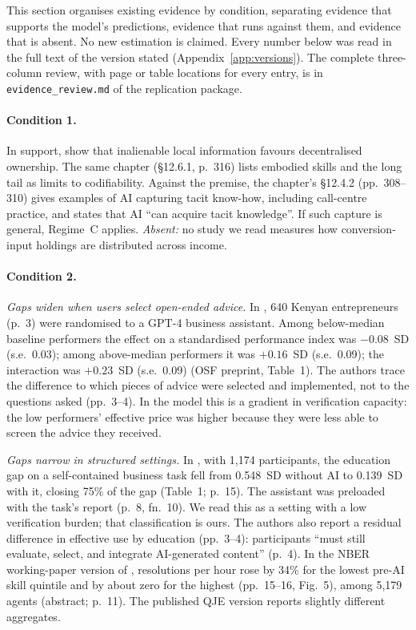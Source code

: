 \documentclass[12pt]{article}
\theoremstyle{remark}
\begin{document}
This section organises existing evidence by condition, separating evidence that supports the model's predictions, evidence that runs against them, and evidence that is absent. No new estimation is claimed. Every number below was read in the full text of the version stated (Appendix~\ref{app:versions}). The complete three-column review, with page or table locations for every entry, is in \texttt{evidence\_review.md} of the replication package.

\paragraph{Condition 1.} In support, \citet[Proposition~2, p.~308]{brynjolfsson2026hayek} show that inalienable local information favours decentralised ownership. The same chapter (\S12.6.1, p.~316) lists embodied skills and the long tail as limits to codifiability. Against the premise, the chapter's \S12.4.2 (pp.~308--310) gives examples of AI capturing tacit know-how, including call-centre practice, and \citet[p.~33]{garicano2026comment} states that AI ``can acquire tacit knowledge''. If such capture is general, Regime~C applies. \emph{Absent:} no study we read measures how conversion-input holdings are distributed across income.

\paragraph{Condition 2.} \emph{Gaps widen when users select open-ended advice.} In \citet{otis2026uneven}, 640 Kenyan entrepreneurs (p.~3) were randomised to a GPT-4 business assistant. Among below-median baseline performers the effect on a standardised performance index was $-0.08$~SD (s.e.\ 0.03); among above-median performers it was $+0.16$~SD (s.e.\ 0.09); the interaction was $+0.23$~SD (s.e.\ 0.09) (OSF preprint, Table~1). The authors trace the difference to which pieces of advice were selected and implemented, not to the questions asked (pp.~3--4). In the model this is a gradient in verification capacity: the low performers' effective price was higher because they were less able to screen the advice they received.

\emph{Gaps narrow in structured settings.} In \citet{cruces2026narrow}, with 1,174 participants, the education gap on a self-contained business task fell from 0.548~SD without AI to 0.139~SD with it, closing 75\% of the gap (Table~1; p.~15). The assistant was preloaded with the task's report (p.~8, fn.~10). We read this as a setting with a low verification burden; that classification is ours. The authors also report a residual difference in effective use by education (pp.~3--4): participants ``must still evaluate, select, and integrate AI-generated content'' (p.~4). In the NBER working-paper version of \citet{brynjolfsson2025work}, resolutions per hour rose by 34\% for the lowest pre-AI skill quintile and by about zero for the highest (pp.~15--16, Fig.~5), among 5,179 agents (abstract; p.~11). The published QJE version reports slightly different aggregates.
\end{document}
